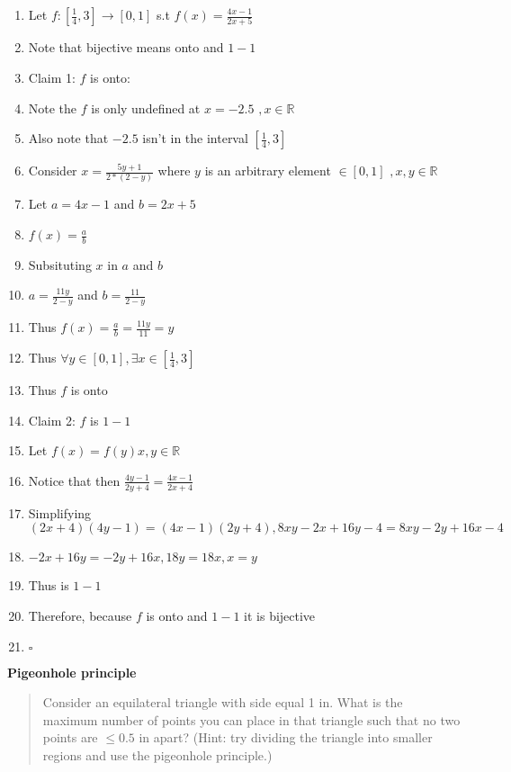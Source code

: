 \documentclass[12pt]{article}
\begin{document}
\begin{enumerate}
\begin{enumerate}
\item Let $f: [\frac{1}{4},3] \rightarrow [0,1]$ s.t $f(x) = \frac{4x-1}{2x+5}$
\item Note that bijective means onto and $1-1$
\item Claim 1: $f$ is onto:
\item Note the $f$ is only undefined at $x= -2.5$ $,x\in \mathbb{R}$
\item Also note that $-2.5$ isn't in the interval $[\frac{1}{4}, 3]$
\item Consider $x= \frac{5y+1}{2*(2-y)}$ where $y$ is an arbitrary element  $\in [0,1]$ $,x,y\in \mathbb{R}$
\item Let $a = 4x-1$ and $b = 2x+5$
\item $f(x) = \frac{a}{b}$
\item Subsituting $x$ in $a$ and $b$
\item $a = \frac{11y}{2-y}$ and $b = \frac{11}{2-y}$
\item Thus $f(x) = \frac{a}{b}  = \frac{11y}{11} = y$ 
\item Thus $\forall y \in [0,1], \exists x \in[\frac{1}{4}, 3]$
\item Thus $f$ is onto
\item Claim 2: $f$ is $1-1$
\item Let $f(x) = f(y) x,y \in \mathbb{R}$
\item Notice that then $\frac{4y-1}{2y+4} = \frac{4x-1}{2x+4}$
\item Simplifying $(2x+4)(4y-1) = (4x-1)(2y+4), 8xy-2x+16y-4=8xy-2y+16x-4$
\item $-2x+16y = -2y+16x, 18y=18x, x=y$
\item Thus is $1-1$
\item Therefore, because $f$ is onto and $1-1$ it is bijective
\item $\square$
\end{enumerate}
\newpage
\item \textbf{Pigeonhole principle}

\begin{quote}
\item Consider an equilateral triangle with side equal 1 in. What is the
maximum number of points you can place in that triangle such that no
two points are $\le 0.5$ in apart?   (Hint:  try dividing the triangle
into smaller regions and use the pigeonhole principle.)
\end{quote}


\end{enumerate}
\end{document}
